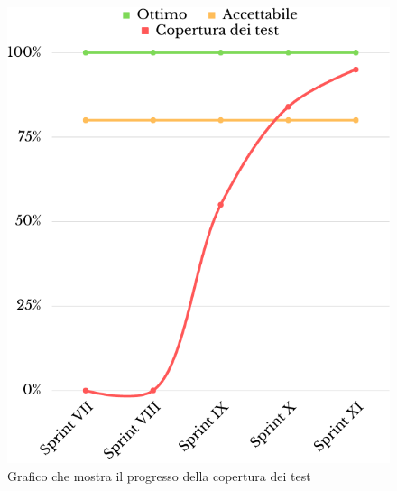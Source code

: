 \begin{figure}[H]
	\centering
	\includegraphics[scale=0.35]{img/copertura_test.png}
	\caption{Grafico che mostra il progresso della copertura dei test}
\end{figure}
